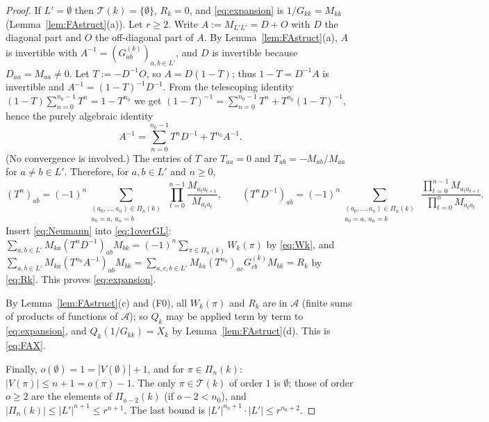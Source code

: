 \begin{proof}
If $L'=\emptyset$ then $\mathcal T(k)=\{\emptyset\}$, $R_k=0$, and \eqref{eq:expansion} is $1/G_{kk}=M_{kk}$ (Lemma~\ref{lem:FAstruct}(a)). Let $r\ge2$. Write $A:=M_{L'L'}=D+O$ with $D$ the diagonal part and $O$ the off-diagonal part of $A$. By Lemma~\ref{lem:FAstruct}(a), $A$ is invertible with
$A^{-1}=(G^{(k)}_{ab})_{a,b\in L'}$, and $D$ is invertible because $D_{aa}=M_{aa}\ne0$. Let $T:=-D^{-1}O$, so $A=D(1-T)$; thus $1-T=D^{-1}A$ is invertible and $A^{-1}=(1-T)^{-1}D^{-1}$. From the telescoping identity $(1-T)\sum_{n=0}^{n_0-1}T^n=1-T^{n_0}$ we get
$(1-T)^{-1}=\sum_{n=0}^{n_0-1}T^n+T^{n_0}(1-T)^{-1}$, hence the purely algebraic identity
\begin{equation}\label{eq:Neumann}
 A^{-1}=\sum_{n=0}^{n_0-1}T^nD^{-1}+T^{n_0}A^{-1}.
\end{equation}
(No convergence is involved.) The entries of $T$ are $T_{aa}=0$ and $T_{ab}=-M_{ab}/M_{aa}$ for $a\ne b\in L'$. Therefore, for $a,b\in L'$ and $n\ge0$,
\[
 (T^n)_{ab}=(-1)^n\sum_{\substack{(a_0,\dots,a_n)\in\Pi_n(k)\\ a_0=a,\ a_n=b}}\ \prod_{t=0}^{n-1}\frac{M_{a_ta_{t+1}}}{M_{a_ta_t}},\qquad(T^nD^{-1})_{ab}=(-1)^n\sum_{\substack{(a_0,\dots,a_n)\in\Pi_n(k)\\ a_0=a,\ a_n=b}}\ \frac{\prod_{t=0}^{n-1}M_{a_ta_{t+1}}}{\prod_{t=0}^{n}M_{a_ta_t}} .
\]
Insert \eqref{eq:Neumann} into \eqref{eq:1overGL}: $\sum_{a,b\in L'}M_{ka}(T^nD^{-1})_{ab}M_{bk}=(-1)^n\sum_{\pi\in\Pi_n(k)}W_k(\pi)$ by \eqref{eq:Wk}, and
$\sum_{a,b\in L'}M_{ka}(T^{n_0}A^{-1})_{ab}M_{bk}=\sum_{a,c,b\in L'}M_{ka}(T^{n_0})_{ac}G^{(k)}_{cb}M_{bk}=R_k$ by \eqref{eq:Rk}. This proves \eqref{eq:expansion}.

By Lemma~\ref{lem:FAstruct}(c) and (F0), all $W_k(\pi)$ and $R_k$ are in $\mathcal A$ (finite sums of products of functions of $\mathcal A$); so $Q_k$ may be applied term by term to \eqref{eq:expansion}, and $Q_k(1/G_{kk})=X_k$ by Lemma~\ref{lem:FAstruct}(d). This is \eqref{eq:FAX}.

Finally, $o(\emptyset)=1=|V(\emptyset)|+1$, and for $\pi\in\Pi_n(k)$: $|V(\pi)|\le n+1=o(\pi)-1$. The only $\pi\in\mathcal T(k)$ of order $1$ is $\emptyset$; those of order $o\ge2$ are the elements of $\Pi_{o-2}(k)$ (if $o-2<n_0$), and $|\Pi_{n}(k)|\le|L'|^{n+1}\le r^{n+1}$.
The last bound is $|L'|^{n_0+1}\cdot|L'|\le r^{n_0+2}$.
\end{proof}

